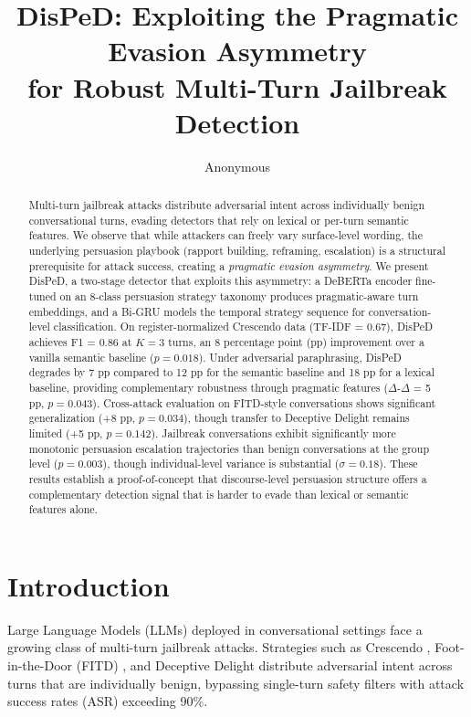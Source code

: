 \documentclass[11pt,a4paper]{article}
\title{DisPeD: Exploiting the Pragmatic Evasion Asymmetry\\for Robust Multi-Turn Jailbreak Detection}
\author{Anonymous}
\date{}
\begin{document}
\maketitle

\begin{abstract}
Multi-turn jailbreak attacks distribute adversarial intent across individually benign conversational turns, evading detectors that rely on lexical or per-turn semantic features.
We observe that while attackers can freely vary surface-level wording, the underlying persuasion playbook (rapport building, reframing, escalation) is a structural prerequisite for attack success, creating a \emph{pragmatic evasion asymmetry}.
We present DisPeD, a two-stage detector that exploits this asymmetry: a DeBERTa encoder fine-tuned on an 8-class persuasion strategy taxonomy produces pragmatic-aware turn embeddings, and a Bi-GRU models the temporal strategy sequence for conversation-level classification.
On register-normalized Crescendo data (TF-IDF = 0.67), DisPeD achieves F1 = 0.86 at $K{=}3$ turns, an 8 percentage point (pp) improvement over a vanilla semantic baseline ($p{=}0.018$).
Under adversarial paraphrasing, DisPeD degrades by 7 pp compared to 12 pp for the semantic baseline and 18 pp for a lexical baseline, providing complementary robustness through pragmatic features ($\Delta$-$\Delta$ = 5 pp, $p{=}0.043$).
Cross-attack evaluation on FITD-style conversations shows significant generalization (+8 pp, $p{=}0.034$), though transfer to Deceptive Delight remains limited (+5 pp, $p{=}0.142$).
Jailbreak conversations exhibit significantly more monotonic persuasion escalation trajectories than benign conversations at the group level ($p{=}0.003$), though individual-level variance is substantial ($\sigma{=}0.18$).
These results establish a proof-of-concept that discourse-level persuasion structure offers a complementary detection signal that is harder to evade than lexical or semantic features alone.
\end{abstract}

\section{Introduction}

Large Language Models (LLMs) deployed in conversational settings face a growing class of multi-turn jailbreak attacks. Strategies such as Crescendo \citep{russinovich2024greatwritearticle}, Foot-in-the-Door (FITD) \citep{zhou2024speak}, and Deceptive Delight \citep{jiang2024deceptivedelight} distribute adversarial intent across turns that are individually benign, bypassing single-turn safety filters with attack success rates (ASR) exceeding 90\%.
\end{document}
